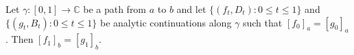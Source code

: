 Let $\gamma: [0, 1] \to \mathbb{C}$ be a path from $a$ to $b$ and let $\{(f_t, D_t): 0 \leq t \leq 1\}$ and $\{(g_t, B_t): 0 \leq t \leq 1\}$ be analytic continuations along $\gamma$ such that $[f_0]_a = [g_0]_a$. Then $[f_1]_b = [g_1]_b$.